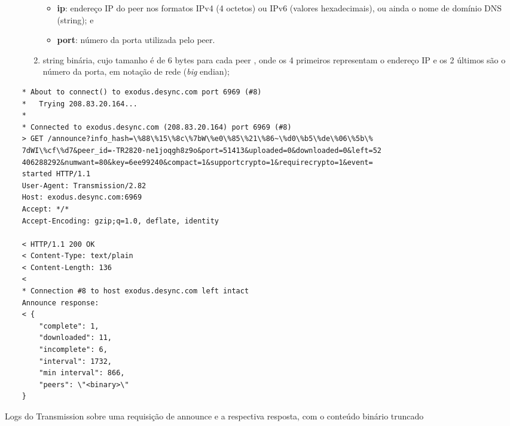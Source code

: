 \begin{description}
\begin{enumerate}
\begin{itemize}
                \item \textbf{ip}: endereço IP do \gls*{peer} nos formatos IPv4
                    (4 octetos) ou IPv6 (valores hexadecimais), ou ainda o nome de
                    domínio DNS (string); e

                \item \textbf{port}: número da porta utilizada pelo \gls*{peer}.
            \end{itemize}

            \item \gls*{string} binária, cujo tamanho é de 6 bytes para cada \gls*{peer}
                , onde os 4 primeiros representam o endereço IP e os 2 últimos são o
                número da porta, em notação de rede (\emph{big} \gls{endian});
        \end{enumerate}
\end{description}


\begin{listing}[H]
    \begin{verbatim}
    * About to connect() to exodus.desync.com port 6969 (#8)
    *   Trying 208.83.20.164...
    *
    * Connected to exodus.desync.com (208.83.20.164) port 6969 (#8)
    > GET /announce?info_hash=\%88\%15\%8c\%7bW\%e0\%85\%21\%86~\%d0\%b5\%de\%06\%5b\%
    7dWI\%cf\%d7&peer_id=-TR2820-ne1joqgh8z9o&port=51413&uploaded=0&downloaded=0&left=52
    406288292&numwant=80&key=6ee99240&compact=1&supportcrypto=1&requirecrypto=1&event=
    started HTTP/1.1
    User-Agent: Transmission/2.82
    Host: exodus.desync.com:6969
    Accept: */*
    Accept-Encoding: gzip;q=1.0, deflate, identity

    < HTTP/1.1 200 OK
    < Content-Type: text/plain
    < Content-Length: 136
    <
    * Connection #8 to host exodus.desync.com left intact
    Announce response:
    < {
        "complete": 1,
        "downloaded": 11,
        "incomplete": 6,
        "interval": 1732,
        "min interval": 866,
        "peers": \"<binary>\"
    }
    \end{verbatim}

    \caption{Logs do Transmission sobre uma requisição de announce e a respectiva
    resposta, com o conteúdo binário truncado}
    \label{lst:announce}
\end{listing}

